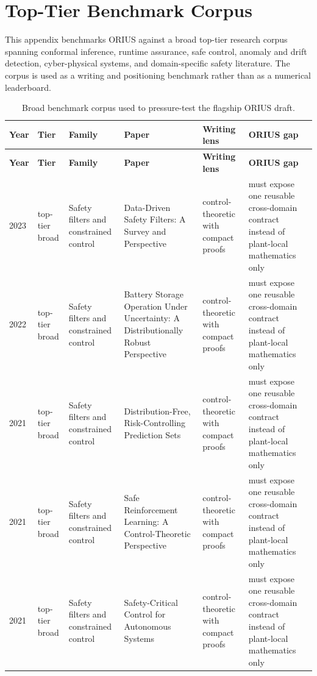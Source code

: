 \section{Top-Tier Benchmark Corpus}
\label{sec:ieee-benchmark-corpus}
This appendix benchmarks ORIUS against a broad top-tier research corpus spanning conformal inference, runtime assurance, safe control, anomaly and drift detection, cyber-physical systems, and domain-specific safety literature. The corpus is used as a writing and positioning benchmark rather than as a numerical leaderboard.

\begin{longtable}{p{}p{}p{}p{}p{}p{}}
\caption{Broad benchmark corpus used to pressure-test the flagship ORIUS draft.}\\
\toprule
\textbf{Year} & \textbf{Tier} & \textbf{Family} & \textbf{Paper} & \textbf{Writing lens} & \textbf{ORIUS gap}\\
\midrule
\endfirsthead
\toprule
\textbf{Year} & \textbf{Tier} & \textbf{Family} & \textbf{Paper} & \textbf{Writing lens} & \textbf{ORIUS gap}\\
\midrule
\endhead
2023 & top-tier broad & Safety filters and constrained control & Data-Driven Safety Filters: A Survey and Perspective & control-theoretic with compact proofs & must expose one reusable cross-domain contract instead of plant-local mathematics only\\
2022 & top-tier broad & Safety filters and constrained control & Battery Storage Operation Under Uncertainty: A Distributionally Robust Perspective & control-theoretic with compact proofs & must expose one reusable cross-domain contract instead of plant-local mathematics only\\
2021 & top-tier broad & Safety filters and constrained control & Distribution-Free, Risk-Controlling Prediction Sets & control-theoretic with compact proofs & must expose one reusable cross-domain contract instead of plant-local mathematics only\\
2021 & top-tier broad & Safety filters and constrained control & Safe Reinforcement Learning: A Control-Theoretic Perspective & control-theoretic with compact proofs & must expose one reusable cross-domain contract instead of plant-local mathematics only\\
2021 & top-tier broad & Safety filters and constrained control & Safety-Critical Control for Autonomous Systems & control-theoretic with compact proofs & must expose one reusable cross-domain contract instead of plant-local mathematics only\\

\end{longtable}
